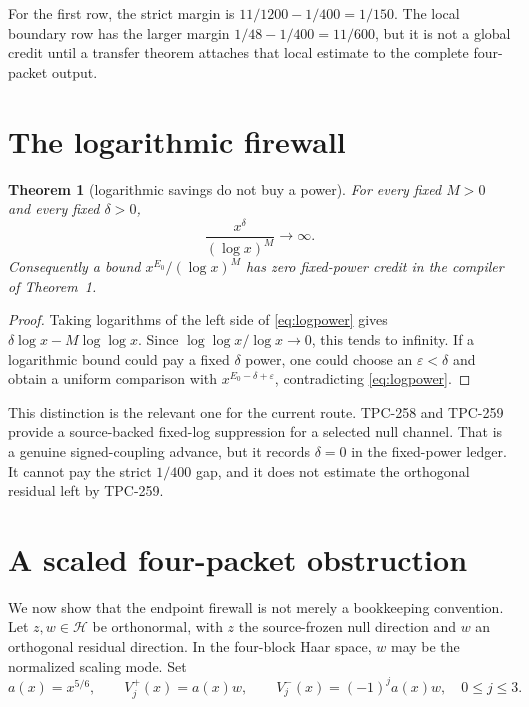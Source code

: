 \documentclass[11pt]{article}
\newtheorem{theorem}{Theorem}
\theoremstyle{definition}
\newcommand{\HH}{\mathcal H}
\begin{document}
For the first row, the strict margin is
$11/1200-1/400=1/150$.  The local boundary row has the larger margin
$1/48-1/400=11/600$, but it is not a global credit until a transfer theorem
attaches that local estimate to the complete four-packet output.

\section{The logarithmic firewall}

\begin{theorem}[logarithmic savings do not buy a power]
For every fixed $M>0$ and every fixed $\delta>0$,
\begin{equation}
 \frac{x^\delta}{(\log x)^M}\longrightarrow\infty.
 \label{eq:logpower}
\end{equation}
Consequently a bound $x^{E_0}/(\log x)^M$ has zero fixed-power credit in the
compiler of Theorem~1.
\end{theorem}

\begin{proof}
Taking logarithms of the left side of \eqref{eq:logpower} gives
$\delta\log x-M\log\log x$.  Since $\log\log x/\log x\to0$, this tends to
infinity.  If a logarithmic bound could pay a fixed $\delta$ power, one could
choose an $\varepsilon<\delta$ and obtain a uniform comparison with
$x^{E_0-\delta+\varepsilon}$, contradicting \eqref{eq:logpower}.
\end{proof}

This distinction is the relevant one for the current route.  TPC-258 and
TPC-259 provide a source-backed fixed-log suppression for a selected null
channel.  That is a genuine signed-coupling advance, but it records
$\delta=0$ in the fixed-power ledger.  It cannot pay the strict $1/400$ gap,
and it does not estimate the orthogonal residual left by TPC-259.

\section{A scaled four-packet obstruction}

We now show that the endpoint firewall is not merely a bookkeeping convention.
Let $z,w\in\HH$ be orthonormal, with $z$ the source-frozen null direction and
$w$ an orthogonal residual direction.  In the four-block Haar space, $w$ may
be the normalized scaling mode.  Set
\begin{equation}
 a(x)=x^{5/6},\qquad
 V_j^+(x)=a(x)w,\qquad
 V_j^-(x)=(-1)^j a(x)w,\quad 0\leq j\leq3.
 \label{eq:scaled}
\end{equation}
\end{document}
